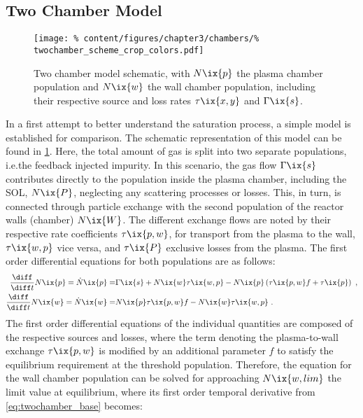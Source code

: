         \subsection{Two Chamber Model}\label{subsec:twochamb}%
%
            \begin{figure}[t]%
                \centering%
                \texttt{[image: \%
                    content/figures/chapter3/chambers/\%
                    twochamber\_scheme\_crop\_colors.pdf]}%
                \caption{Two chamber model schematic, with $N\ix{p}$ the plasma chamber population and $N\ix{w}$ the wall chamber population, including their respective source and loss rates $\tau\ix{x,y}$ and $\Gamma\ix{s}$.}\label{fig:twochamber_schematic}%
            \end{figure}%
%
            In a first attempt to better understand the saturation process, a simple model is established for comparison. The schematic representation of this model can be found in \cref{fig:twochamber_schematic}. Here, the total amount of gas is split into two separate populations, i.e.the feedback injected impurity. In this scenario, the gas flow $\Gamma\ix{s}$ contributes directly to the population inside the plasma chamber, including the SOL, $N\ix{P}$, neglecting any scattering processes or losses. This, in turn, is connected through particle exchange with the second population of the reactor walls (chamber) $N\ix{W}$. The different exchange flows are noted by their respective rate coefficients $\tau\ix{p,w}$, for transport from the plasma to the wall, $\tau\ix{w,p}$ vice versa, and $\tau\ix{P}$ exclusive losses from the plasma. The first order differential equations for both populations are as follows:%
%
            \begin{align}
                \begin{split}\label{eq:twochamber_base}%
                    \frac{\diff}{\diff t}N\ix{p}=\dot{N}\ix{p}=&\Gamma\ix{s}+N\ix{w}\tau\ix{w,p}-N\ix{p}\left(\tau\ix{p,w}f+\tau\ix{p}\right)\,\,,\\%
                    \frac{\diff}{\diff t}N\ix{w}=\dot{N}\ix{w}=&N\ix{p}\tau\ix{p,w}f-N\ix{w}\tau\ix{w,p}\,\,.%
                \end{split}%
            \end{align}%
%
            The first order differential equations of the individual quantities are composed of the respective sources and losses, where the term denoting the plasma-to-wall exchange $\tau\ix{p,w}$ is modified by an additional parameter $f$ to satisfy the equilibrium requirement at the threshold population. Therefore, the equation for the wall chamber population can be solved for approaching $N\ix{w,lim}$ the limit value at equilibrium, where its first order temporal derivative from \cref{eq:twochamber_base} becomes:%
